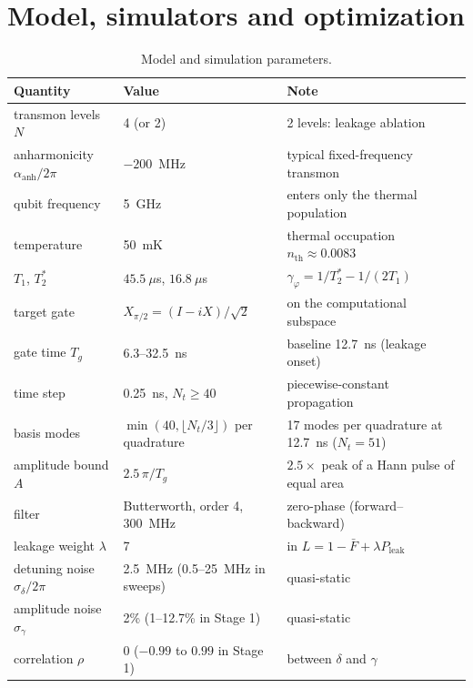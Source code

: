 \documentclass[aps,pra,onecolumn,notitlepage,superscriptaddress,nofootinbib,floatfix]{revtex4-2}
\begin{document}
\section{Model, simulators and optimization}
\label{sec:modeldetails}
\begin{table}[htbp]
\centering\small
\begin{tabular}{@{}llp{}@{}}
\toprule
Quantity & Value & Note\\
\midrule
transmon levels $N$ & 4 (or 2) & 2 levels: leakage ablation\\
anharmonicity $\alpha_{\mathrm{anh}}/2\pi$ & $-200$~MHz & typical fixed-frequency transmon \cite{Koch2007,Krantz2019}\\
qubit frequency & 5~GHz & enters only the thermal population\\
temperature & 50~mK & thermal occupation $n_{\mathrm{th}}\approx0.0083$\\
$T_1$, $T_2^*$ & $45.5~\mu$s, $16.8~\mu$s & $\gamma_\varphi=1/T_2^*-1/(2T_1)$\\
target gate & $X_{\pi/2}=(I-iX)/\sqrt2$ & on the computational subspace\\
gate time $T_g$ & 6.3--32.5~ns & baseline 12.7~ns (leakage onset)\\
time step & 0.25~ns, $N_t\ge40$ & piecewise-constant propagation\\
basis modes & $\min(40,\lfloor N_t/3\rfloor)$ per quadrature & 17 modes per quadrature at 12.7~ns ($N_t=51$)\\
amplitude bound $A$ & $2.5\,\pi/T_g$ & $2.5\times$ peak of a Hann pulse of equal area\\
filter & Butterworth, order 4, 300~MHz & zero-phase (forward--backward)\\
leakage weight $\lambda$ & 7 & in $L=1-\bar F+\lambda P_{\mathrm{leak}}$\\
detuning noise $\sigma_\delta/2\pi$ & 2.5~MHz (0.5--25~MHz in sweeps) & quasi-static\\
amplitude noise $\sigma_\gamma$ & 2\% (1--12.7\% in Stage 1) & quasi-static\\
correlation $\rho$ & 0 ($-0.99$ to $0.99$ in Stage 1) & between $\delta$ and $\gamma$\\
\bottomrule
\end{tabular}
\caption{Model and simulation parameters.}
\label{tab:params}
\end{table}
\end{document}
